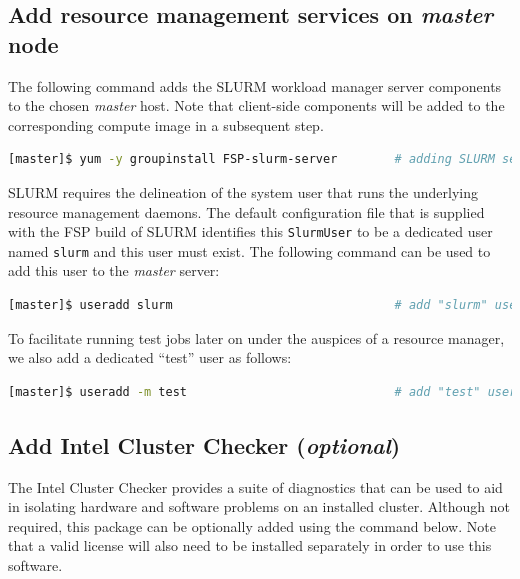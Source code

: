 \documentclass[letterpaper]{article}
\begin{document}
\subsection{Add resource management services on {\em master} node} \label{sec:add_rm}

The following command adds the SLURM workload manager server components to the
chosen {\em master} host. Note that client-side components will be added to
the corresponding compute image in a subsequent step.

\begin{lstlisting}[language=bash,keywords={}]
[master]$ yum -y groupinstall FSP-slurm-server        # adding SLURM server support
\end{lstlisting}

SLURM requires the delineation of the system user that runs the underlying
resource management daemons. The default configuration file that is supplied
with the FSP build of SLURM identifies this \texttt{SlurmUser} to be a
dedicated user named \texttt{slurm} and this user must exist. 
The following command can be used to add this user to the {\em
  master} server:

\begin{lstlisting}[language=bash,keywords={}]
[master]$ useradd slurm                               # add "slurm" user
\end{lstlisting}

To facilitate running test jobs later on under the auspices of a resource
manager, we also add a dedicated ``test'' user as follows:

\begin{lstlisting}[language=bash,keywords={}]
[master]$ useradd -m test                             # add "test" user
\end{lstlisting}

\subsection{Add Intel Cluster Checker ({\em optional})} \label{sec:add_clck}

The Intel Cluster Checker provides a suite of diagnostics that can be used to
aid in isolating hardware and software problems on an installed
cluster. Although not required, this package can be optionally added using the
command below. Note that a valid license will also need to be installed
separately in order to use this software.
\end{document}
